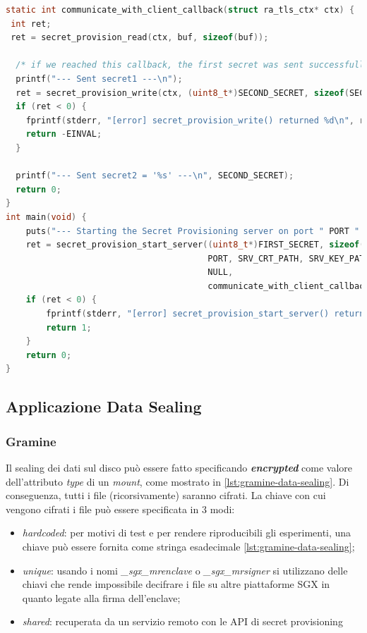 \documentclass{article}
\begin{document}
\begin{lstlisting}[language=c,caption=Interazione continua con il client,label=lst:server-secret-prov-callback]
static int communicate_with_client_callback(struct ra_tls_ctx* ctx) {
 int ret;
 ret = secret_provision_read(ctx, buf, sizeof(buf));

  /* if we reached this callback, the first secret was sent successfully */
  printf("--- Sent secret1 ---\n");
  ret = secret_provision_write(ctx, (uint8_t*)SECOND_SECRET, sizeof(SECOND_SECRET));
  if (ret < 0) {
    fprintf(stderr, "[error] secret_provision_write() returned %d\n", ret);
    return -EINVAL;
  }

  printf("--- Sent secret2 = '%s' ---\n", SECOND_SECRET);
  return 0;
}
int main(void) {
    puts("--- Starting the Secret Provisioning server on port " PORT " ---");
    ret = secret_provision_start_server((uint8_t*)FIRST_SECRET, sizeof(FIRST_SECRET),
                                        PORT, SRV_CRT_PATH, SRV_KEY_PATH,
                                        NULL,
                                        communicate_with_client_callback);
    if (ret < 0) {
        fprintf(stderr, "[error] secret_provision_start_server() returned %d\n", ret);
        return 1;
    }
    return 0;
} 
\end{lstlisting}

\subsection{Applicazione Data Sealing}
\subsubsection{Gramine}
Il sealing dei dati sul disco può essere fatto specificando \textbf{\textit{encrypted}} come valore dell'attributo \textit{type} di un \textit{mount}, come mostrato in \cref{lst:gramine-data-sealing}. Di conseguenza, tutti i file (ricorsivamente) saranno cifrati. La chiave con cui vengono cifrati i file può essere specificata in $3$ modi:
\begin{itemize}
  \item \textit{hardcoded}: per motivi di test e per rendere riproducibili gli esperimenti, una chiave può essere fornita come stringa esadecimale \cref{lst:gramine-data-sealing};
  \item \textit{unique}: usando i nomi \textit{\_sgx\_mrenclave} o \textit{\_sgx\_mrsigner} si utilizzano delle chiavi che rende impossibile decifrare i file su altre piattaforme SGX in quanto legate alla firma dell'enclave;
  \item \textit{shared}: recuperata da un servizio remoto con le API di secret provisioning
\end{itemize}
\end{document}

